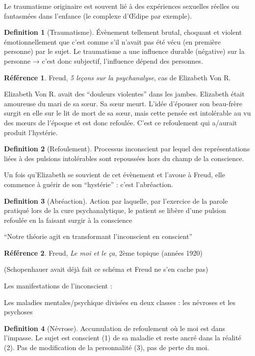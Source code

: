 \documentclass[french]{book}
\theoremstyle{definition}
\newtheorem*{dfn}{Definition}
\newtheorem*{refe}{Référence}
\begin{document}
Le traumatisme originaire est souvent lié à des expériences sexuelles réelles ou fantasmées dans l'enfance (le complexe d'Œdipe par exemple).

\begin{dfn}[Traumatisme]
	Évènement tellement brutal, choquant et violent émotionnellement que c'est comme s'il n'avait pas été vécu (en première personne) par le sujet. Le traumatisme a une influence durable (négative) sur la personne → c'est donc subjectif, l'influence dépend des personnes.
\end{dfn}


\begin{refe}
	Freud, \textit{5 leçons sur la psychanalyse}, cas de Elizabeth Von R.
\end{refe}

Elizabeth Von R. avait des “douleurs violentes” dans les jambes. Elizabeth était amoureuse du mari de sa sœur. Sa sœur meurt. L’idée d’épouser son beau-frère surgit en elle sur le lit de mort de sa sœur, mais cette pensée est intolérable au vu des mœurs de l’époque et est donc refoulée. C’est ce refoulement qui a/aurait produit l’hystérie.

\begin{dfn}[Refoulement]
	Processus inconscient par lequel des représentations liées à des pulsions intolérables sont repoussées hors du champ de la conscience.
\end{dfn}


Un fois qu'Elizabeth se souvient de cet évènement et l’avoue à Freud, elle commence à guérir de son “hystérie” : c’est l’abréaction.

\begin{dfn}[Abréaction]
	Action par laquelle, par l’exercice de la parole pratiqué lors de la cure psychanalytique, le patient se libère d’une pulsion refoulée en la faisant surgir à la conscience
\end{dfn}


“Notre théorie agit en transformant l’inconscient en conscient”

\begin{refe}
	Freud, \textit{Le moi et le ça}, 2ème topique (années 1920)
\end{refe}
(Schopenhauer avait déjà fait ce schéma et Freud ne s’en cache pas)

Les manifestations de l’inconscient :

Les maladies mentales/psychique divisées en deux classes : les névroses et les psychoses

\begin{dfn}[Névrose]
	Accumulation de refoulement où le moi est dans l’impasse. Le sujet est conscient (1) de sa maladie et reste ancré dans la réalité (2). Pas de modification de la personnalité (3), pas de perte du moi.
\end{dfn}
\end{document}
